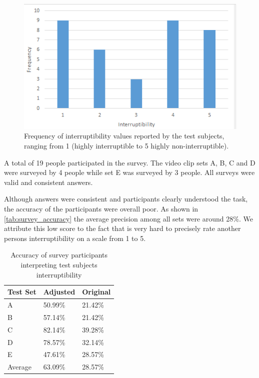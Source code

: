 \documentclass{sigchi}
\begin{document}
\begin{figure}
  \centering
  \includegraphics[width=\columnwidth]{figures/Interruptibility_values_videotest.png}
  \caption{Frequency of interruptibility values reported by the test subjects, ranging from 1 (highly interruptible to 5 highly non-interruptible).}
  \label{fig:interruptibilityFrequency}
\end{figure}

A total of 19 people participated in the survey. 
The video clip sets A, B, C and D were surveyed by 4 people while set E was surveyed by 3 people. 
All surveys were valid and consistent answers. 

Although answers were consistent and participants clearly understood the task, the accuracy of the participants were overall poor. 
As shown in \autoref{tab:survey_accuracy} the average precision among all sets were around 28\%.
We attribute this low score to the fact that is very hard to precisely rate another persons interruptibility on a scale from 1 to 5. 

\begin{table}[h]
  \begin{tabular}{@{}lll@{}}
    \toprule
    Test Set     & Adjusted & Original \\ \midrule
    A       & 50.99\%    & 21.42\%    \\
    B       & 57.14\%    & 21.42\%    \\
    C       & 82.14\%    & 39.28\%    \\
    D       & 78.57\%    & 32.14\%    \\
    E       & 47.61\%    & 28.57\%    \\ \midrule
    Average & 63.09\%    & 28.57\%    \\ \bottomrule
  \end{tabular}
  \caption{Accuracy of survey participants interpreting test subjects interruptibility}
  \label{tab:survey_accuracy}
\end{table}
\end{document}
